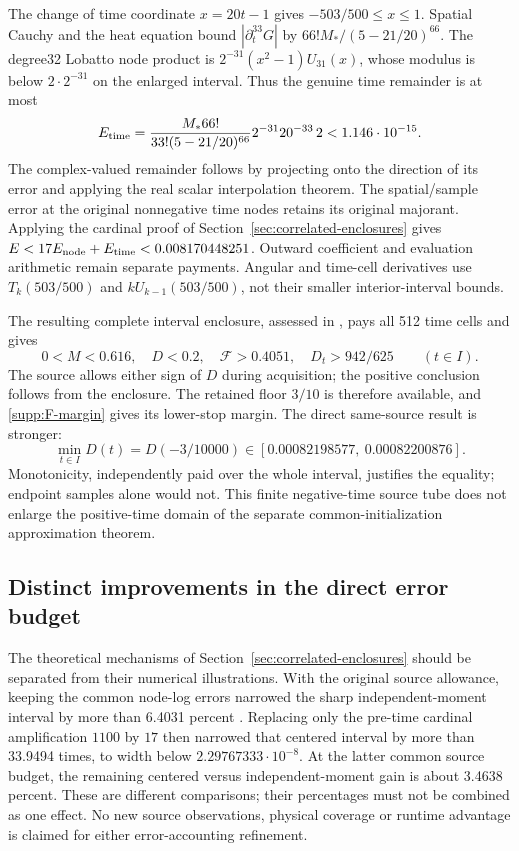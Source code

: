 The change of time coordinate $x=20t-1$ gives
$-503/500\le x\le1$. Spatial Cauchy and the heat equation bound
$|\partial_t^{33}G|$ by $66!M_* /(5-21/20)^{66}$.
The degree32 Lobatto node product is
$2^{-31}(x^2-1)U_{31}(x)$, whose modulus is below $2\cdot2^{-31}$
on the enlarged interval. Thus the genuine time remainder is at most
\[
 E_{\rm time}
 =\frac{M_*66!}{33!(5-21/20)^{66}}2^{-31}20^{-33}\,2
 <1.146\cdot10^{-15}.
\]
The complex-valued remainder follows by projecting onto the direction
of its error and applying the real scalar interpolation theorem.
The spatial/sample error at the original nonnegative time nodes retains
its original majorant. Applying the cardinal proof of
Section~\ref{sec:correlated-enclosures} gives
$E<17E_{\rm node}+E_{\rm time}<0.008170448251$.
Outward coefficient and evaluation arithmetic remain separate payments.
Angular and time-cell derivatives use $T_k(503/500)$ and
$kU_{k-1}(503/500)$, not their smaller interior-interval bounds.

The resulting complete interval enclosure, assessed in
\cite{BakerCM45,BakerCMReview39}, pays all 512 time cells and gives
\[
 0<M<0.616,\quad D<0.2,\quad \mathcal F>0.4051,\quad
 D_t>942/625\qquad(t\in I).
\]
The source allows either sign of $D$ during acquisition; the positive
conclusion follows from the enclosure. The retained floor $3/10$ is
therefore available, and \eqref{supp:F-margin} gives its lower-stop
margin. The direct same-source result is stronger:
\begin{equation}
 \min_{t\in I}D(t)=D(-3/10000)
 \in[0.00082198577,\ 0.00082200876].
 \label{supp:refined-minimum}
\end{equation}
Monotonicity, independently paid over the whole interval, justifies the
equality; endpoint samples alone would not. This finite negative-time
source tube does not enlarge the positive-time domain of the separate
common-initialization approximation theorem.

\subsection{Distinct improvements in the direct error budget}
\label{supp:widths}

The theoretical mechanisms of Section~\ref{sec:correlated-enclosures}
should be separated from their numerical illustrations.
With the original source allowance, keeping the common node-log errors
narrowed the sharp independent-moment interval by more than 6.4031 percent
\cite{BakerCM42,BakerCMReview37}. Replacing only the pre-time cardinal
amplification $1100$ by $17$ then narrowed that centered interval by
more than 33.9494 times, to width below $2.29767333\cdot10^{-8}$.
At the latter common source budget, the remaining centered versus
independent-moment gain is about 3.4638 percent. These are different
comparisons; their percentages must not be combined as one effect.
No new source observations, physical coverage or runtime advantage is
claimed for either error-accounting refinement.

